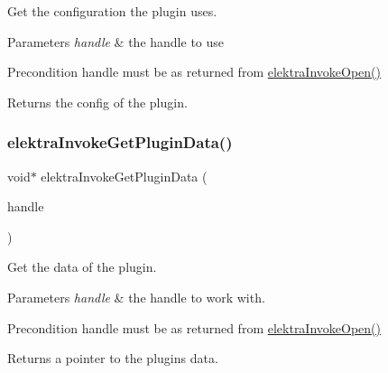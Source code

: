 Get the configuration the plugin uses. 


\begin{DoxyParams}{Parameters}
{\em handle} & the handle to use\\
\hline
\end{DoxyParams}
\begin{DoxyPrecond}{Precondition}
handle must be as returned from \mbox{\hyperlink{group__invoke_ga3eb20131e9a8fc9a6cebf126927c09bc}{elektra\+Invoke\+Open()}}
\end{DoxyPrecond}
\begin{DoxyReturn}{Returns}
the config of the plugin. 
\end{DoxyReturn}
\mbox{\label{group__invoke_gac615e211a4d3c77addfa18152c274345}} 
\subsubsection{\texorpdfstring{elektraInvokeGetPluginData()}{elektraInvokeGetPluginData()}}
{\footnotesize\ttfamily void$\ast$ elektra\+Invoke\+Get\+Plugin\+Data (\begin{DoxyParamCaption}\item[{Elektra\+Invoke\+Handle $\ast$}]{handle }\end{DoxyParamCaption})}



Get the data of the plugin. 


\begin{DoxyParams}{Parameters}
{\em handle} & the handle to work with.\\
\hline
\end{DoxyParams}
\begin{DoxyPrecond}{Precondition}
handle must be as returned from \mbox{\hyperlink{group__invoke_ga3eb20131e9a8fc9a6cebf126927c09bc}{elektra\+Invoke\+Open()}}
\end{DoxyPrecond}
\begin{DoxyReturn}{Returns}
a pointer to the plugin\textquotesingle{}s data. 
\end{DoxyReturn}
\mbox{\label{group__invoke_ga13bd3afe428624d459239df73641d769}} 
